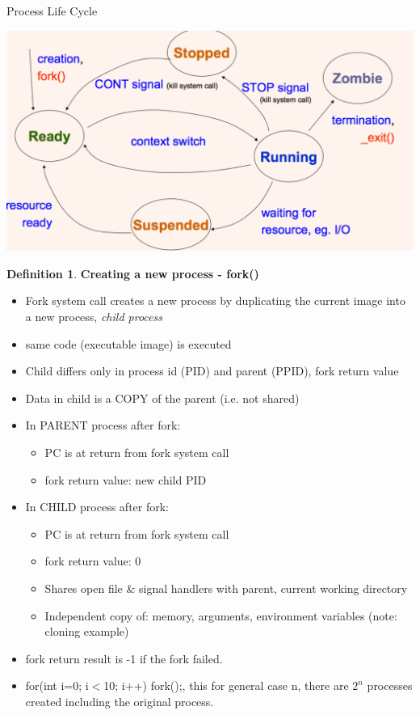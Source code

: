 \documentclass[12pt,a4paper]{article}
\theoremstyle{definition}
\newtheorem{definition}{Definition}[section]
\newenvironment{myitemize}
{ \begin{itemize}
    \setlength{\itemsep}{5pt}
    \setlength{\parskip}{0pt}
    \setlength{\parsep}{0pt}     }
{ \end{itemize}                  }
\begin{document}
\begin{tcolorbox}
	\textsf{Process Life Cycle}
	
	\includegraphics[scale=0.3]{m1/processLifeCycle}
	\centering
\end{tcolorbox}

\begin{definition}{\textbf{Creating a new process - \textsf{fork()}}}
	\begin{myitemize}
		\item Fork system call creates a new process by duplicating the current image into a new process, \textit{child process}
		\item \textsf{same code} (executable image) is executed
		\item Child differs only in process id (PID) and parent (PPID), fork return value
		\item Data in child is a COPY of the parent (i.e. not shared)
		\item In PARENT process after fork:
		\begin{myitemize}
			\item PC is at return from fork system call
			\item fork return value: new child PID
		\end{myitemize}
		\item In CHILD process after fork:
		\begin{myitemize}
			\item PC is at return from fork system call
			\item fork return value: 0
			\item Shares open file \& signal handlers with parent, current working directory
			\item Independent copy of: memory, arguments, environment variables (note: cloning example)
		\end{myitemize}
		\item fork return result is -1 if the fork failed.
		\item \textsf{for(int i=0; i$<$10; i++) fork();}, this for general case n, there are $2^n$ processes created including the original process. 
	\end{myitemize}
\end{definition}
\end{document}
